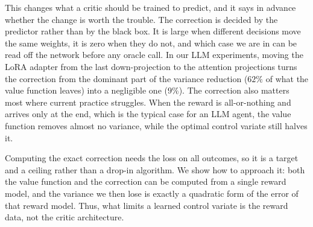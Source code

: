\documentclass[10pt]{article}
\theoremstyle{plain}
\theoremstyle{definition}
\theoremstyle{remark}
\theoremstyle{definition}
\begin{document}
This changes what a critic should be trained to predict, and it says in advance whether the change is worth the trouble. The correction is decided by the predictor rather than by the black box. It is large when different decisions move the same weights, it is zero when they do not, and which case we are in can be read off the network before any oracle call. In our LLM experiments, moving the LoRA adapter from the last down-projection to the attention projections turns the correction from the dominant part of the variance reduction ($62\%$ of what the value function leaves) into a negligible one ($9\%$). The correction also matters most where current practice struggles. When the reward is all-or-nothing and arrives only at the end, which is the typical case for an LLM agent, the value function removes almost no variance, while the optimal control variate still halves it.

Computing the exact correction needs the loss on all outcomes, so it is a target and a ceiling rather than a drop-in algorithm. We show how to approach it: both the value function and the correction can be computed from a single reward model, and the variance we then lose is exactly a quadratic form of the error of that reward model. Thus, what limits a learned control variate is the reward data, not the critic architecture.
\end{document}
